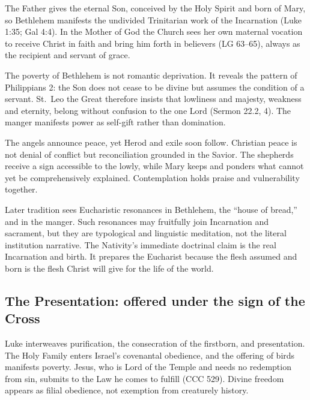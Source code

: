 The Father gives the eternal Son, conceived by the Holy Spirit and born of Mary, so Bethlehem manifests the undivided Trinitarian work of the Incarnation (Luke 1:35; Gal 4:4). In the Mother of God the Church sees her own maternal vocation to receive Christ in faith and bring him forth in believers (LG 63--65), always as the recipient and servant of grace.

The poverty of Bethlehem is not romantic deprivation. It reveals the pattern of Philippians 2: the Son does not cease to be divine but assumes the condition of a servant. St.~Leo the Great therefore insists that lowliness and majesty, weakness and eternity, belong without confusion to the one Lord (Sermon 22.2, 4). The manger manifests power as self-gift rather than domination.

The angels announce peace, yet Herod and exile soon follow. Christian peace is not denial of conflict but reconciliation grounded in the Savior. The shepherds receive a sign accessible to the lowly, while Mary keeps and ponders what cannot yet be comprehensively explained. Contemplation holds praise and vulnerability together.

Later tradition sees Eucharistic resonances in Bethlehem, the ``house of bread,'' and in the manger. Such resonances may fruitfully join Incarnation and sacrament, but they are typological and linguistic meditation, not the literal institution narrative. The Nativity's immediate doctrinal claim is the real Incarnation and birth. It prepares the Eucharist because the flesh assumed and born is the flesh Christ will give for the life of the world.

\subsection{The Presentation: offered under the sign of the Cross}


Luke interweaves purification, the consecration of the firstborn, and presentation. The Holy Family enters Israel's covenantal obedience, and the offering of birds manifests poverty. Jesus, who is Lord of the Temple and needs no redemption from sin, submits to the Law he comes to fulfill (CCC 529). Divine freedom appears as filial obedience, not exemption from creaturely history.

